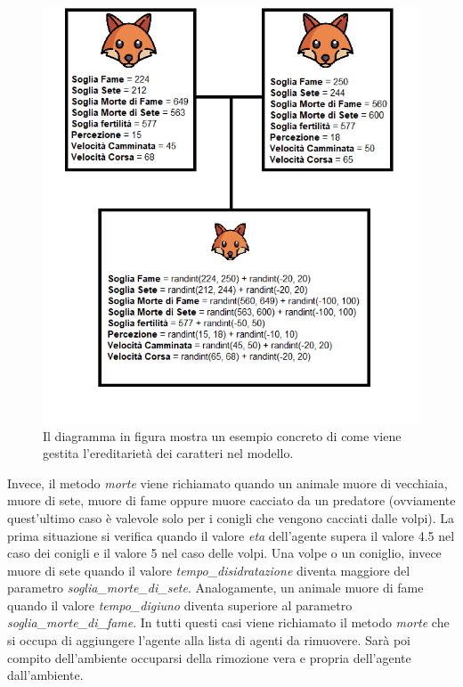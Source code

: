 \documentclass[11pt]{article}
\begin{document}
\begin{figure}[h!]
     \centering
     \includegraphics[scale = 0.8]{Accoppiamento_evoluzione.png}
     \caption{Il diagramma in figura mostra un esempio concreto di come viene gestita l'ereditarietà dei caratteri nel modello.}
     \label{fig:EsempioEvoluzione}
\end{figure}

Invece, il metodo \emph{morte} viene richiamato quando un animale muore di vecchiaia, muore di sete, muore di fame oppure muore cacciato da un predatore (ovviamente quest'ultimo caso è valevole solo per i conigli che vengono cacciati dalle volpi). La prima situazione si verifica quando il valore \emph{eta} dell'agente supera il valore 4.5 nel caso dei conigli e il valore 5 nel caso delle volpi. Una volpe o un coniglio, invece muore di sete quando il valore \emph{tempo\_disidratazione} diventa maggiore del parametro \emph{soglia\_morte\_di\_sete}. Analogamente, un animale muore di fame quando il valore \emph{tempo\_digiuno} diventa superiore al parametro \emph{soglia\_morte\_di\_fame}. In tutti questi casi viene richiamato il metodo \emph{morte} che si occupa di aggiungere l'agente alla lista di agenti da rimuovere. Sarà poi compito dell'ambiente occuparsi della rimozione vera e propria dell'agente dall'ambiente. 
\end{document}
